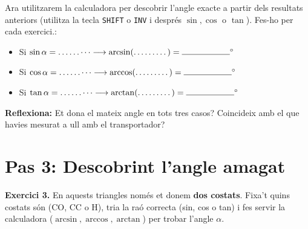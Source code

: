 \documentclass[12pt,a4paper]{article}
\begin{document}
\vspace{0.3cm}
\begin{tcolorbox}[colback=yellow!10,colframe=yellow!60!black,title=La màgia de desfer: \textbf{arcsin, arccos, arctan}]
Ara utilitzarem la calculadora per descobrir l'angle exacte a partir dels resultats anteriors (utilitza la tecla \texttt{SHIFT} o \texttt{INV} i després $\sin, \cos$ o $\tan$). Fes-ho per cada exercici.:
\begin{itemize}
    \item Si $\sin \alpha = \dots\dots\dots \longrightarrow \arcsin(\dots\dots\dots) = \makebox[2cm]{\hrulefill}^\circ$
    \item Si $\cos \alpha = \dots\dots\dots \longrightarrow \arccos(\dots\dots\dots) = \makebox[2cm]{\hrulefill}^\circ$
    \item Si $\tan \alpha = \dots\dots\dots \longrightarrow \arctan(\dots\dots\dots) = \makebox[2cm]{\hrulefill}^\circ$
\end{itemize}
\textbf{Reflexiona:} Et dona el mateix angle en tots tres casos? Coincideix amb el que havies mesurat a ull amb el transportador? \makebox[5cm]{\hrulefill}
\end{tcolorbox}

\vspace{0.8cm}

\newpage

\section*{Pas 3: Descobrint l'angle amagat}
\textbf{Exercici 3.} En aquests triangles només et donem \textbf{dos costats}. Fixa't quins costats són (CO, CC o H), tria la raó correcta (sin, cos o tan) i fes servir la calculadora ($\arcsin, \arccos, \arctan$) per trobar l'angle $\alpha$.

\vspace{0.5cm}
\end{document}
